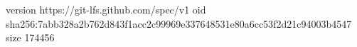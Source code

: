 version https://git-lfs.github.com/spec/v1
oid sha256:7abb328a2b762d843f1acc2c99969e337648531e80a6cc53f2d21c94003b4547
size 174456
